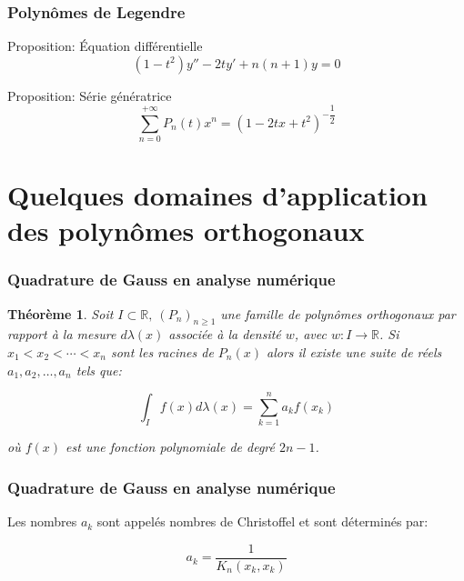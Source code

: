 \documentclass[xcolor=dvipsnames,10pt,mathserif]{beamer}
\theoremstyle{plain}
\newtheorem{thm}{Th\'eor\`eme}%
\newcommand{\R}{\mathbb{R}}
\begin{document}
\begin{frame}\frametitle{Polynômes de Legendre \hfill \insertpagenumber}
\begin{block}{Proposition: Équation différentielle}
\begin{equation}
(1-t^{2})y''-2ty'+n(n+1)y=0
\end{equation}
\end{block}
\pause
\begin{block}{Proposition: Série génératrice}
\begin{equation}
\sum\limits_{n=0}^{+\infty}P_n(t)x^n = (1-2tx+t^2)^{-\dfrac{1}{2}}
\end{equation}
\end{block}
\end{frame}
\section{Quelques domaines d'application des polynômes orthogonaux}
 
\begin{frame} \frametitle{Quadrature de Gauss en analyse numérique \hfill \insertpagenumber}

\begin{thm}
Soit $I\subset\R, \ (P_n)_{n\geqslant 1}$ une famille de polynômes orthogonaux par rapport à la mesure $d\lambda(x)$ associée à la densité $w$, avec $w:I\longrightarrow \R$. Si $x_1< x_2< \cdots < x_n$ sont les racines de $P_n(x)$ alors il existe une suite de réels $a_1,a_2, \dots ,a_n$ tels que: 

\begin{equation}
\int_I{f(x)d\lambda(x)}=\sum\limits_{k=1}^n a_k f(x_k)
\end{equation}

où $f(x)$ est une fonction polynomiale de degré $2n-1$.
\end{thm}

\end{frame} 
 

\begin{frame}\frametitle{Quadrature de Gauss en analyse numérique \hfill \insertpagenumber}

\begin{block}{}
Les nombres $a_k$ sont appelés nombres de Christoffel et sont déterminés par:

\begin{equation}
a_k=\dfrac{1}{K_n(x_k,x_k)}
\end{equation}

\end{block}

\end{frame}
  
\end{document}
